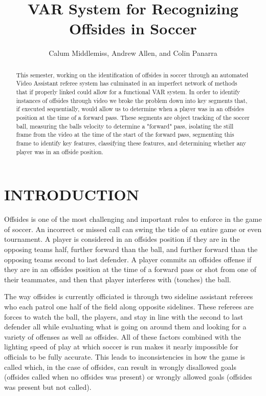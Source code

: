 \documentclass[letterpaper, 10 pt, conference]{ieeeconf}  %
\title{\LARGE \bf
VAR System for Recognizing Offsides in Soccer
}
\author{Calum Middlemiss, Andrew Allen, and Colin Panarra%
}
\begin{document}
\maketitle
\thispagestyle{empty}
\pagestyle{empty}


\begin{abstract}

This semester, working on the identification of offsides in soccer through an automated Video Assistant referee system has culminated in an imperfect network of methods that if properly linked could allow for a functional VAR system. In order to identify instances of offsides through video we broke the problem down into key segments that, if executed sequentially, would allow us to determine when a player was in an offsides position at the time of a forward pass. These segments are object tracking of the soccer ball, measuring the balls velocity to determine a "forward" pass, isolating the still frame from the video at the time of the start of the forward pass, segmenting this frame to identify key features, classifying these features, and determining whether any player was in an offside position. 

\end{abstract}


\section{INTRODUCTION}

Offsides is one of the most challenging and important rules to enforce in the game of soccer. An incorrect or missed call can swing the tide of an entire game or even tournament. A player is considered in an offsides position if they are in the opposing teams half, further forward than the ball, and further forward than the opposing teams second to last defender. A player commits an offsides offense if they are in an offsides position at the time of a forward pass or shot from one of their teammates, and then that player interferes with (touches) the ball. 

The way offsides is currently officiated is through two sideline assistant referees who each patrol one half of the field along opposite sidelines. These referees are forces to watch the ball, the players, and stay in line with the second to last defender all while evaluating what is going on around them and looking for a variety of offenses as well as offsides. All of these factors combined with the lighting speed of play at which soccer is run makes it nearly impossible for officials to be fully accurate. This leads to inconsistencies in how the game is called which, in the case of offsides, can result in wrongly disallowed goals (offsides called when no offsides was present) or wrongly allowed goals (offsides was present but not called).
\end{document}
